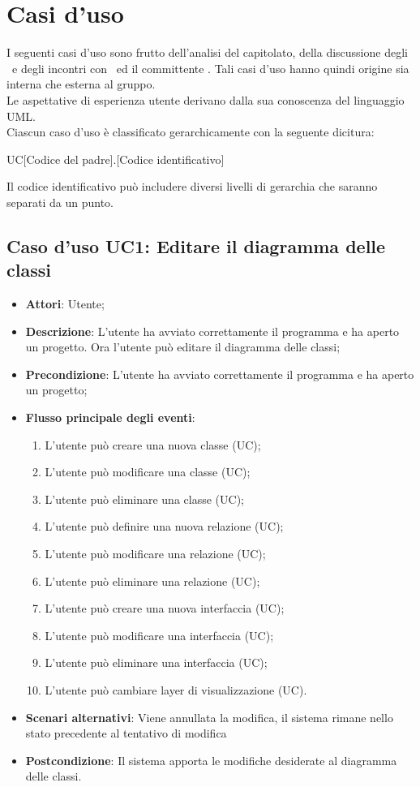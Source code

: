 \documentclass[../AnalisiDeiRequisiti.tex]{subfiles}
\begin{document}
	\section{Casi d'uso }
	I seguenti casi d'uso sono frutto dell'analisi del capitolato, della discussione degli
	\analisti\ e degli incontri con	\proponente\ ed il committente \vardanega.
	Tali casi d'uso hanno quindi origine sia interna che esterna al gruppo.\\
	Le aspettative di esperienza utente derivano dalla sua conoscenza del
	linguaggio UML.\\
	Ciascun caso d'uso è classificato gerarchicamente con la seguente dicitura:
	\begin{center}
		UC[Codice del padre].[Codice identificativo]
	\end{center}
	Il codice identificativo può includere diversi livelli di gerarchia che saranno
	separati da un punto.
	\subsection{Caso d'uso UC1: Editare il diagramma delle classi}
	\begin{itemize}
		\item \textbf{Attori}: Utente;
		
		\item \textbf{Descrizione}: L'utente ha avviato correttamente il programma e ha aperto un progetto. Ora l'utente può editare il diagramma delle classi;
		
		\item \textbf{Precondizione}: L'utente ha avviato correttamente il programma e ha aperto un progetto;
		\item \textbf{Flusso principale degli eventi}:
		\begin{enumerate}
			\item L'utente può creare una nuova classe (UC);
			\item L'utente può modificare una classe (UC);
			\item L'utente può eliminare una classe (UC);
			\item L'utente può definire una nuova relazione (UC);
			\item L'utente può modificare una relazione (UC);
			\item L'utente può eliminare una relazione (UC);
			\item L'utente può creare una nuova interfaccia (UC);
			\item L'utente può modificare una interfaccia (UC);
			\item L'utente può eliminare una interfaccia (UC);
			\item L'utente può cambiare layer di visualizzazione (UC).
		\end{enumerate}
		
		\item \textbf{Scenari alternativi}: Viene annullata la modifica, il sistema
		rimane nello stato precedente al tentativo di modifica
		
		\item \textbf{Postcondizione}: Il sistema apporta le modifiche desiderate al diagramma delle classi.
	\end{itemize}
	
\end{document}

